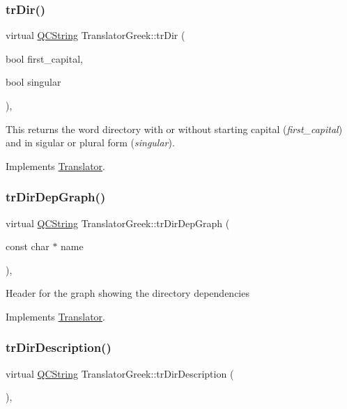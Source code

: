 \subsubsection{\texorpdfstring{trDir()}{trDir()}}
{\footnotesize\ttfamily virtual \mbox{\hyperlink{class_q_c_string}{Q\+C\+String}} Translator\+Greek\+::tr\+Dir (\begin{DoxyParamCaption}\item[{bool}]{first\+\_\+capital,  }\item[{bool}]{singular }\end{DoxyParamCaption})\hspace{0.3cm}{\ttfamily [inline]}, {\ttfamily [virtual]}}

This returns the word directory with or without starting capital ({\itshape first\+\_\+capital}) and in sigular or plural form ({\itshape singular}). 

Implements \mbox{\hyperlink{class_translator}{Translator}}.

\mbox{\label{class_translator_greek_a43c9deea936a4f0c0d4fda118f36f521}} 
\subsubsection{\texorpdfstring{trDirDepGraph()}{trDirDepGraph()}}
{\footnotesize\ttfamily virtual \mbox{\hyperlink{class_q_c_string}{Q\+C\+String}} Translator\+Greek\+::tr\+Dir\+Dep\+Graph (\begin{DoxyParamCaption}\item[{const char $\ast$}]{name }\end{DoxyParamCaption})\hspace{0.3cm}{\ttfamily [inline]}, {\ttfamily [virtual]}}

Header for the graph showing the directory dependencies 

Implements \mbox{\hyperlink{class_translator}{Translator}}.

\mbox{\label{class_translator_greek_a2410b2b5234092224fee5b9ff94df61d}} 
\subsubsection{\texorpdfstring{trDirDescription()}{trDirDescription()}}
{\footnotesize\ttfamily virtual \mbox{\hyperlink{class_q_c_string}{Q\+C\+String}} Translator\+Greek\+::tr\+Dir\+Description (\begin{DoxyParamCaption}{ }\end{DoxyParamCaption})\hspace{0.3cm}{\ttfamily [inline]}, {\ttfamily [virtual]}}


